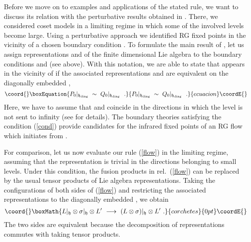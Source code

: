 \documentclass[a4paper,prd,twocolumn,nobibnotes,amssymb,preprintnumbers]{revtex4}
\begin{document}
Before we move on to examples and applications of the stated rule, 
we want to discuss its relation with the perturbative results 
obtained in \cite{Fredenhagen:2001kw}. There, we considered 
coset models in a limiting regime in which some of the involved 
levels become large. Using a perturbative approach we identified 
RG fixed points \coordHE{} in the vicinity of a chosen boundary condition 
\coordHE{}. To formulate the main result of \cite{Fredenhagen:2001kw}, let
us assign representations \coordHE{} and \coordHE{} of the finite dimensional 
Lie algebra \coordHE{} to the boundary conditions \coordHE{} and
\coordHE{} (see above). With this notation, we are able to state that 
\coordHE{} appears in the vicinity of \coordHE{} if the associated representations
\coordHE{} and \coordHE{} are equivalent on the diagonally embedded 
\coordHE{},
\begin{equation}\coord{}\boxEquation{ \label{cond} 
P_0|_{\mathfrak{h}_{\rm diag}}\ \sim \ Q_0|_{\mathfrak{h}_{\rm diag}}\ \ .
}{ P_0|_{\mathfrak{h}_{\rm diag}}\ \sim \ Q_0|_{\mathfrak{h}_{\rm diag}}\ \ .
}{ecuacion}\coordE{}\end{equation} 
Here, we have to assume that \coordHE{} and \coordHE{} coincide in the directions 
in which the level is not sent to infinity (see \cite{Fredenhagen:2001kw}
for details). The boundary theories \coordHE{} satisfying the condition 
(\ref{cond}) provide candidates for the infrared fixed points of 
an RG flow which initiates from \coordHE{}. 

For comparison, let us now evaluate our rule (\ref{flow}) in the limiting 
regime, assuming that the representation \myHighlight{$\sigma $}\coordHE{} is trivial in 
the directions belonging to small levels. Under this condition, the 
fusion products in rel.\ (\ref{flow}) can be replaced by the usual 
tensor products of Lie algebra representations. Taking the 
configurations of both sides of (\ref{flow}) and restricting 
the associated representations to the diagonally embedded \coordHE{}, we 
obtain
\[\coord{}\boxMath{
L|_{\mathfrak{h}}\otimes \sigma|_{\mathfrak{h}}\otimes L' \ \longrightarrow\ (L\otimes
\sigma )|_{\mathfrak{h}}\otimes L'\ .
}{corchetes}{0pt}\coordE{}\]
The two sides are equivalent because the decomposition of
representations commutes with taking tensor products.
\medskip 
\end{document}
